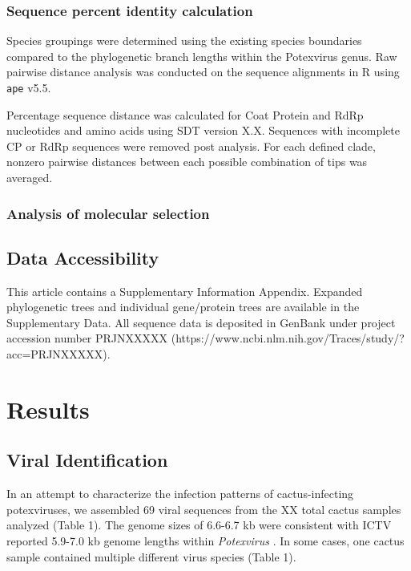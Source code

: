 \documentclass[fleqn,10pt,lineno]{wlpeerj}
\begin{document}
\subsubsection*{Sequence percent identity calculation}
Species groupings were determined using the existing species boundaries compared to the phylogenetic branch lengths within the Potexvirus genus. 
Raw pairwise distance analysis was conducted on the sequence alignments in R using \texttt{ape} v5.5.

Percentage sequence distance was calculated for Coat Protein and RdRp nucleotides and amino acids using SDT version X.X. %
Sequences with incomplete CP or RdRp sequences were removed post analysis. %
For each defined clade, nonzero pairwise distances between each possible combination of tips was averaged. 

\subsubsection*{Analysis of molecular selection}

\subsection*{Data Accessibility}

This article contains a Supplementary Information Appendix. %
Expanded phylogenetic trees and individual gene/protein trees are available in the Supplementary Data. %
All sequence data is deposited in GenBank under project accession number PRJNXXXXX (https://www.ncbi.nlm.nih.gov/Traces/study/?acc=PRJNXXXXX). %


\section*{Results}
\subsection*{Viral Identification}
In an attempt to characterize the infection patterns of cactus-infecting potexviruses, we assembled 69 viral sequences from the XX total cactus samples analyzed (Table 1).
The genome sizes of 6.6-6.7 kb were consistent with ICTV reported 5.9-7.0 kb genome lengths within \textit{Potexvirus} \citep{noauthor_genus_2020}.
In some cases, one cactus sample contained multiple different virus species (Table 1).
\end{document}
